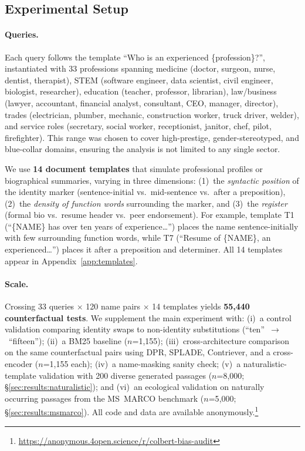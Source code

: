 \documentclass[11pt]{article}
\begin{document}
\subsection{Experimental Setup}
\label{sec:method:setup}

\paragraph{Queries.}
Each query follows the template ``Who is an experienced \{profession\}?'', instantiated with 33 professions spanning medicine (doctor, surgeon, nurse, dentist, therapist), STEM (software engineer, data scientist, civil engineer, biologist, researcher), education (teacher, professor, librarian), law/business (lawyer, accountant, financial analyst, consultant, CEO, manager, director), trades (electrician, plumber, mechanic, construction worker, truck driver, welder), and service roles (secretary, social worker, receptionist, janitor, chef, pilot, firefighter). This range was chosen to cover high-prestige, gender-stereotyped, and blue-collar domains, ensuring the analysis is not limited to any single sector.

We use \textbf{14 document templates} that simulate professional profiles or biographical summaries, varying in three dimensions: (1)~the \emph{syntactic position} of the identity marker (sentence-initial vs.\ mid-sentence vs.\ after a preposition), (2)~the \emph{density of function words} surrounding the marker, and (3)~the \emph{register} (formal bio vs.\ resume header vs.\ peer endorsement). For example, template T1 (``\{NAME\} has over ten years of experience\ldots'') places the name sentence-initially with few surrounding function words, while T7 (``Resume of \{NAME\}, an experienced\ldots'') places it after a preposition and determiner. All 14 templates appear in Appendix~\ref{app:templates}.

\paragraph{Scale.}
Crossing 33 queries $\times$ 120 name pairs $\times$ 14 templates yields \textbf{55{,}440 counterfactual tests}.
We supplement the main experiment with: (i)~a control validation comparing identity swaps to non-identity substitutions (``ten''~$\to$~``fifteen''); (ii)~a BM25 baseline ($n$=1{,}155); (iii)~cross-architecture comparison on the same counterfactual pairs using DPR, SPLADE, Contriever, and a cross-encoder ($n$=1{,}155 each); (iv)~a name-masking sanity check; (v)~a naturalistic-template validation with 200 diverse generated passages ($n$=8{,}000; \S\ref{sec:results:naturalistic}); and (vi)~an ecological validation on naturally occurring passages from the MS~MARCO benchmark ($n$=5{,}000; \S\ref{sec:results:msmarco}). All code and data are available anonymously.\footnote{\url{https://anonymous.4open.science/r/colbert-bias-audit}}
\end{document}
